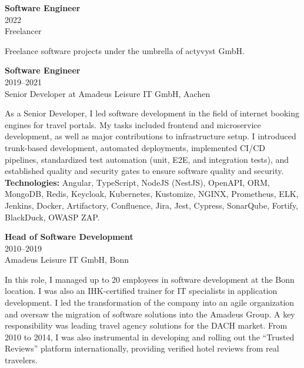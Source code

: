 \documentclass[a4paper,10pt]{article}
\newcommand{\experience}[4]{
  \begin{adjustbox}{}
    \begin{minipage}[t]{0.25\textwidth}
      \textbf{\color{sectionblue}#1} \\
      {\color{sectiongray}#2} \\
      #3\\
    \end{minipage}
    \hspace{1em}
    \begin{minipage}[t]{0.75\textwidth}
      #4\\
    \end{minipage}
  \end{adjustbox}
}
\begin{document}
  \experience
  {Software Engineer}
  {2022}
  {Freelancer}
  {Freelance software projects under the umbrella of actyvyst GmbH.}

  \vspace{1em}{\color{sectionblue}\rule{\textwidth}{0.4pt}}\vspace{1em}

  \experience
  {Software Engineer}
  {2019–2021}
  {Senior Developer at Amadeus Leisure IT GmbH, Aachen}
  {As a Senior Developer, I led software development in the field of internet booking engines for travel portals. My tasks included frontend and microservice development, as well as major contributions to infrastructure setup. I introduced trunk-based development, automated deployments, implemented CI/CD pipelines, standardized test automation (unit, E2E, and integration tests), and established quality and security gates to ensure software quality and security.\\
  \textbf{Technologies:} Angular, TypeScript, NodeJS (NestJS), OpenAPI, ORM, MongoDB, Redis, Keycloak, Kubernetes, Kustomize, NGINX, Prometheus, ELK, Jenkins, Docker, Artifactory, Confluence, Jira, Jest, Cypress, SonarQube, Fortify, BlackDuck, OWASP ZAP.}

  \vspace{1em}{\color{sectionblue}\rule{\textwidth}{0.4pt}}\vspace{1em}

  \begin{adjustbox}{}
  \begin{minipage}[t]{0.25\textwidth}
  \textbf{\color{sectionblue}Head of Software Development} \\
  {\color{sectiongray}2010–2019} \\
  Amadeus Leisure IT GmbH, Bonn
  \end{minipage}
  \hspace{1em}
  \begin{minipage}[t]{0.75\textwidth}
  In this role, I managed up to 20 employees in software development at the Bonn location. I was also an IHK-certified trainer for IT specialists in application development. I led the transformation of the company into an agile organization and oversaw the migration of software solutions into the Amadeus Group. A key responsibility was leading travel agency solutions for the DACH market. From 2010 to 2014, I was also instrumental in developing and rolling out the “Trusted Reviews” platform internationally, providing verified hotel reviews from real travelers.
  \end{minipage}
  \end{adjustbox}
\end{document}
